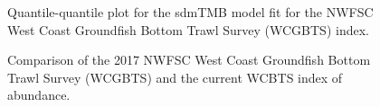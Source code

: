 \documentclass[
]{scrartcl}
\begin{document}
\begin{figure}


\caption{\label{fig-wcgbts_qq}Quantile-quantile plot for the sdmTMB
model fit for the NWFSC West Coast Groundfish Bottom Trawl Survey
(WCGBTS) index.}

\end{figure}%

\begin{figure}


\caption{\label{fig-wcgbtsindexcomparison}Comparison of the 2017 NWFSC
West Coast Groundfish Bottom Trawl Survey (WCGBTS) and the current WCBTS
index of abundance.}

\end{figure}%
\end{document}
